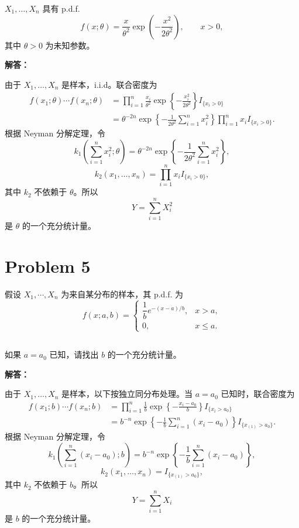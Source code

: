 \documentclass[12pt,a4paper]{article}
\begin{document}
  $X_1,\ldots,X_n$ 具有 p.d.f.
  \[
  f(x;\theta)=\frac{x}{\theta^2}\exp\left(-\frac{x^2}{2\theta^2}\right),\qquad x>0,
  \]
  其中 $\theta>0$ 为未知参数。

\begin{answerbox}
\textbf{解答：}

由于 $X_1,\ldots,X_n$ 是样本，i.i.d。联合密度为
\[
\begin{aligned}
f(x_1;\theta)\cdots f(x_n;\theta)
&=\prod_{i=1}^n\frac{x_i}{\theta^2}\exp\left\{-\frac{x_i^2}{2\theta^2}\right\}I_{\{x_i>0\}}\\
&=\theta^{-2n}\exp\left\{-\frac{1}{2\theta^2}\sum_{i=1}^n x_i^2\right\}
\prod_{i=1}^n x_i I_{\{x_i>0\}}.
\end{aligned}
\]
根据 Neyman 分解定理，令
\[
k_1\left(\sum_{i=1}^n x_i^2;\theta\right)
=\theta^{-2n}\exp\left\{-\frac{1}{2\theta^2}\sum_{i=1}^n x_i^2\right\},
\]
\[
k_2(x_1,\ldots,x_n)=\prod_{i=1}^n x_i I_{\{x_i>0\}},
\]
其中 $k_2$ 不依赖于 $\theta$。所以
\[
Y=\sum_{i=1}^nX_i^2
\]
是 $\theta$ 的一个充分统计量。
\end{answerbox}

\section{Problem 5}

假设 $X_1,\cdots,X_n$ 为来自某分布的样本，其 p.d.f. 为
\[
f(x;a,b)=
\begin{cases}
\dfrac{1}{b}e^{-(x-a)/b}, & x>a,\\
0, & x\leq a.
\end{cases}
\]

\subsection{}

如果 $a=a_0$ 已知，请找出 $b$ 的一个充分统计量。

\begin{answerbox}
\textbf{解答：}

由于 $X_1,\ldots,X_n$ 是样本，以下按独立同分布处理。当 $a=a_0$ 已知时，联合密度为
\[
\begin{aligned}
f(x_1;b)\cdots f(x_n;b)
&=\prod_{i=1}^n\frac1b\exp\left\{-\frac{x_i-a_0}{b}\right\}I_{\{x_i>a_0\}}\\
&=b^{-n}\exp\left\{-\frac{1}{b}\sum_{i=1}^n(x_i-a_0)\right\}I_{\{x_{(1)}>a_0\}}.
\end{aligned}
\]
根据 Neyman 分解定理，令
\[
k_1\left(\sum_{i=1}^n(x_i-a_0);b\right)
=b^{-n}\exp\left\{-\frac{1}{b}\sum_{i=1}^n(x_i-a_0)\right\},
\]
\[
k_2(x_1,\ldots,x_n)=I_{\{x_{(1)}>a_0\}},
\]
其中 $k_2$ 不依赖于 $b$。所以
\[
Y=\sum_{i=1}^nX_i
\]
是 $b$ 的一个充分统计量。
\end{answerbox}
\end{document}
